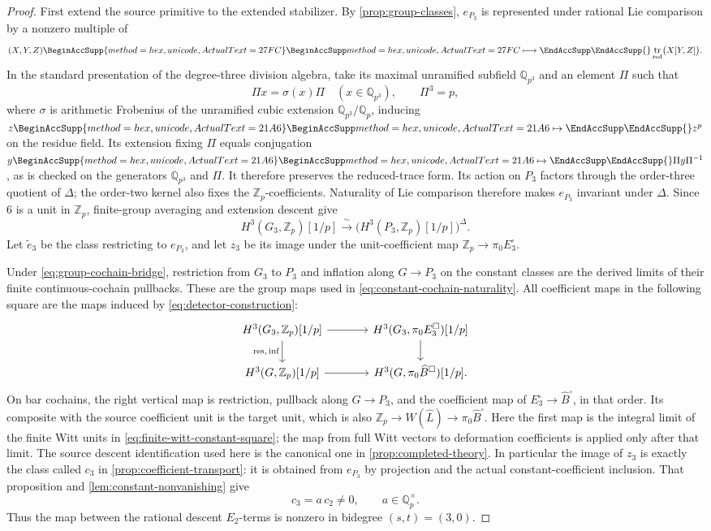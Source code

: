 \documentclass[11pt]{article}
\numberwithin{equation}{section}
\theoremstyle{definition}
\theoremstyle{remark}
\newcommand{\Q}{\mathbb Q}
\newcommand{\Z}{\mathbb Z}
\DeclareMathOperator{\tr}{tr}
\let\UnicodeOriginalMapsto\mapsto
\let\UnicodeOriginalLongmapsto\longmapsto
\DeclareRobustCommand{\mapsto}{
  \BeginAccSupp{method=hex,unicode,ActualText=21A6}
  \UnicodeOriginalMapsto\EndAccSupp{}}
\DeclareRobustCommand{\longmapsto}{
  \BeginAccSupp{method=hex,unicode,ActualText=27FC}
  \UnicodeOriginalLongmapsto\EndAccSupp{}}
\begin{document}
\begin{proof}
First extend the source primitive to the extended stabilizer.
By \cref{prop:group-classes}, $e_{P_3}$ is represented under rational
Lie comparison by a nonzero multiple of
\[
 (X,Y,Z)\longmapsto\tr_{\mathrm{red}}\bigl(X[Y,Z]\bigr).
\]
In the standard presentation of the degree-three division algebra,
take its maximal unramified subfield $\Q_{p^3}$ and an element $\Pi$
such that
\[
 \Pi x=\sigma(x)\Pi\quad(x\in\Q_{p^3}),\qquad \Pi^3=p,
\]
where $\sigma$ is arithmetic Frobenius of the unramified cubic
extension $\Q_{p^3}/\Q_p$, inducing $z\mapsto z^p$ on the residue
field. Its extension fixing $\Pi$ equals conjugation
$y\mapsto\Pi y\Pi^{-1}$, as is checked on the generators
$\Q_{p^3}$ and $\Pi$. It therefore preserves the reduced-trace form.
Its action on $P_3$ factors through the order-three quotient of
$\Delta$; the order-two kernel also fixes the $\Z_p$-coefficients.
Naturality of Lie comparison therefore makes $e_{P_3}$ invariant under
$\Delta$.  Since $6$ is a unit in $\Z_p$, finite-group averaging and
extension descent give
\[
 H^3(G_3,\Z_p)[1/p]
    \xrightarrow{\ \sim\ }
       \bigl(H^3(P_3,\Z_p)[1/p]\bigr)^\Delta.
\]
Let $\widetilde e_3$ be the class restricting to $e_{P_3}$, and let
$z_3$ be its image under the unit-coefficient map
$\Z_p\to\pi_0E_3^{\square}$.

Under \eqref{eq:group-cochain-bridge}, restriction from $G_3$ to $P_3$
and inflation along $G\to P_3$ on the constant classes are the
derived limits of their finite continuous-cochain pullbacks.  These
are the group maps used in \eqref{eq:constant-cochain-naturality}.
All coefficient maps in the following square are the maps induced by
\eqref{eq:detector-construction}:
\[
\begin{tikzcd}[column sep=large]
 H^3(G_3,\Z_p)[1/p]
   \arrow[r] \arrow[d,"{\mathrm{res},\,\mathrm{inf}}"']
 & H^3(G_3,\pi_0E_3^{\square})[1/p]\arrow[d]\\
 H^3(G,\Z_p)[1/p]\arrow[r]
 & H^3(G,\pi_0\widehat B^{\square})[1/p].
\end{tikzcd}
\]
On bar cochains, the right vertical map is restriction, pullback along
$G\to P_3$, and the coefficient map of
$E_3^{\square}\to\widehat B^{\square}$, in that order.
Its composite with the source coefficient unit is the target unit,
which is also $\Z_p\to W(\widehat L)\to\pi_0\widehat B^{\square}$.
Here the first map is the integral limit of the finite Witt units in
\eqref{eq:finite-witt-constant-square}; the map from full Witt vectors
to deformation coefficients is applied only after that limit.
The source descent identification used here is the canonical one in
\cref{prop:completed-theory}.
In particular the image of $z_3$ is exactly the class called $c_3$ in
\cref{prop:coefficient-transport}: it is obtained from $e_{P_3}$ by
projection and the actual constant-coefficient inclusion.  That
proposition and \cref{lem:constant-nonvanishing} give
\[
 c_3=a\,c_2\ne0,\qquad a\in\Q_p^{\times}.
\]
Thus the map between the rational descent $E_2$-terms is nonzero in
bidegree $(s,t)=(3,0)$.


\end{proof}
\end{document}
